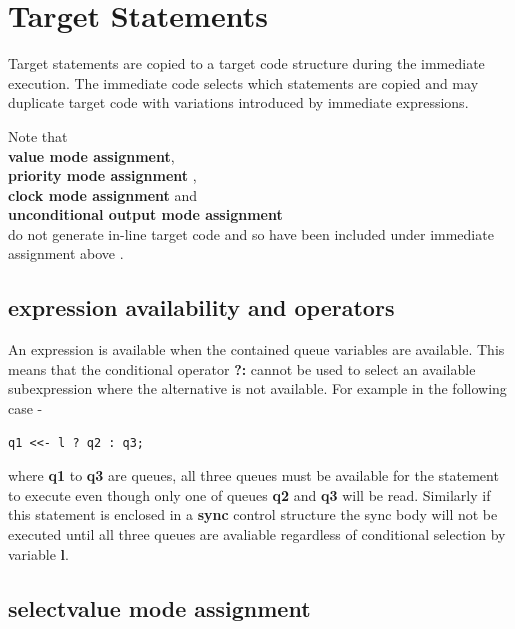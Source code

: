 \pagebreak

\chapter{Target Statements}\label{chap:target}

    Target statements are copied to a target code structure during the
    immediate execution. The immediate code selects which statements are
    copied and may duplicate target code with variations introduced by
    immediate expressions.
    
    Note that \\
    {\bf value mode assignment}, \\
    {\bf priority mode assignment} , \\
    {\bf clock mode assignment} and \\
    {\bf unconditional output mode assignment} \\
    do not generate in-line target code and so
    have been included under immediate assignment above
    .

    \section{expression availability and operators}

        An expression is available when the contained queue variables are
        available. This means that the conditional operator {\bf ?:} cannot be
        used to select an available subexpression where the alternative is not
        available. For example in the following case -
        \begin{lstlisting}[gobble=8, language=threepl]
               q1 <<- l ? q2 : q3;
        \end{lstlisting}
        where {\bf q1} to {\bf q3} are queues, all three queues must be available
        for the statement to execute even though only one of queues {\bf q2} and
        {\bf q3} will be read. Similarly if this statement is enclosed in a
        {\bf sync} control structure the sync body will not be executed
        until all three queues are avaliable regardless of conditional selection
        by variable {\bf l}.

    \section{selectvalue mode assignment}\label{sec:target_selvalass}

